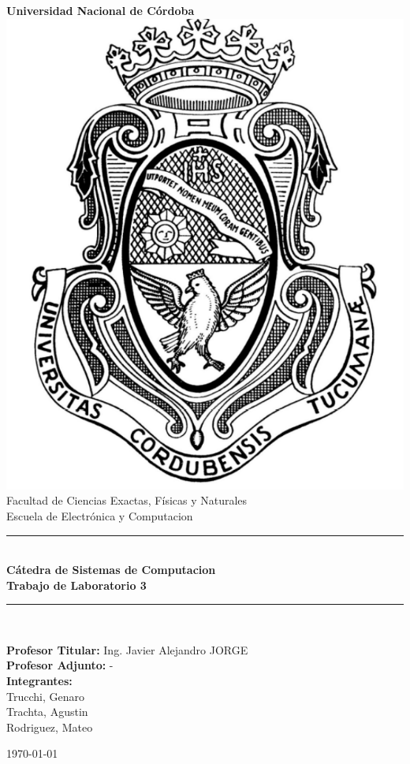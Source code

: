 \begin{titlepage}
    \begin{center}
        {\LARGE \textbf{Universidad Nacional de Córdoba}}\\[1.5cm]

        \includegraphics[scale=0.4]{images/logo2.png}\\[1.5cm]

        {\large Facultad de Ciencias Exactas, Físicas y Naturales}\\
        {\large Escuela de Electrónica y Computacion}\\[1cm]

        \rule{\linewidth}{0.5mm}\\[0.4cm]
        {\Large \textbf{Cátedra de Sistemas de Computacion}}\\[0.3cm]
        {\LARGE \textbf{Trabajo de Laboratorio 3}}\\[0.3cm]

        \rule{\linewidth}{0.5mm}\\[1cm]

        \begin{flushleft}
        {\large 
            \textbf{Profesor Titular:} Ing. Javier Alejandro JORGE\\
            \textbf{Profesor Adjunto:} -\\[0.5cm]
            \textbf{Integrantes:}\\
            Trucchi, Genaro\\
            Trachta, Agustin\\
            Rodriguez, Mateo\\
        }
        \end{flushleft}

        \vfill

        {\large \today}
    \end{center}
\end{titlepage}
